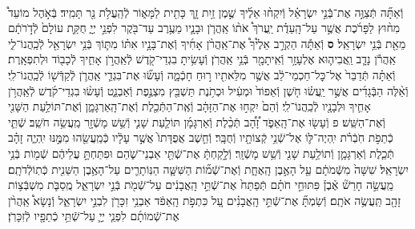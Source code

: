 \documentclass[twoside, openany, parskip=half, 11pt]{book}
\begin{document}
\begin{footnotesize}
\begin{multicols}{2}
\\
וְֿאַתָּ֞ה תְּֿצַוֶּ֣ה אֶת־בְּֿֿנֵ֣י יִשְׂרָאֵ֗ל וְֿיִקְח֨וּ אֵלֶ֜יךָ שֶׁ֣מֶן זַ֥יִת זָ֛ךְ כָּתִ֖ית לַמָּא֑וֹר לְֿהַֽעֲלֹ֥ת נֵ֖ר תָּמִֽיד׃ בְּֿאֹ֣הֶל מוֹעֵד֩ מִח֨וּץ לַפָּרֹ֜כֶת אֲשֶׁ֣ר עַל־הָֽעֵדֻ֗ת יַֽעֲרֹךְ֩ אֹת֨וֹ אַֽהֲרֹ֧ן וּבָנָ֛יו מֵעֶ֥רֶב עַד־בֹּ֖קֶר לִפְנֵ֣י יְיָ֑ חֻקַּ֤ת עוֹלָם֙ לְֿדֹ֣רֹתָ֔ם מֵאֵ֖ת בְּֿנֵ֥י יִשְׂרָאֵֽל׃ \textbf{ס} וְֿאַתָּ֡ה הַקְרֵ֣ב אֵלֶ֩יךָ֩ אֶת־אַֽהֲרֹ֨ן אָחִ֜יךָ וְֿאֶת־בָּנָ֣יו אִתּ֗וֹ מִתּ֛וֹךְ בְּֿנֵ֥י יִשְׂרָאֵ֖ל לְֿכַֽהֲנוֹ־לִ֑י אַֽהֲרֹ֕ן נָדָ֧ב וַֽאֲבִיה֛וּא אֶלְעָזָ֥ר וְֿאִֽיתָמָ֖ר בְּֿנֵ֥י אַֽהֲרֹֽן׃ וְֿעָשִׂ֥יתָ בִגְדֵי־קֹ֖דֶשׁ לְֿאַֽהֲרֹ֣ן אָחִ֑יךָ לְֿכָב֖וֹד וּלְתִפְאָֽרֶת׃
וְֿאַתָּ֗ה תְּֿדַבֵּר֙ אֶל־כׇּל־חַכְמֵי־לֵ֔ב אֲשֶׁ֥ר מִלֵּאתִ֖יו ר֣וּחַ חָכְֿמָ֑ה וְֿעָשׂ֞וּ אֶת־בִּגְדֵ֧י אַֽהֲרֹ֛ן לְֿקַדְּֿשׁ֖וֹ לְֿכַֽהֲנוֹ־לִֽי׃ וְֿאֵ֨לֶּה הַבְּֿגָדִ֜ים אֲשֶׁ֣ר יַֽעֲשׂ֗וּ חֹ֤שֶׁן וְֿאֵפוֹד֙ וּמְעִ֔יל וּכְתֹ֥נֶת תַּשְׁבֵּ֖ץ מִצְנֶ֣פֶת וְֿאַבְנֵ֑ט וְֿעָשׂ֨וּ בִגְדֵי־קֹ֜דֶשׁ לְֿאַֽהֲרֹ֥ן אָחִ֛יךָ וּלְבָנָ֖יו לְֿכַֽהֲנוֹ־לִֽי׃ וְֿהֵם֙ יִקְח֣וּ אֶת־הַזָּהָ֔ב וְֿאֶֽת־הַתְּֿכֵ֖לֶת וְֿאֶת־הָֽאַרְגָּמָ֑ן וְֿאֶת־תּוֹלַ֥עַת הַשָּׁנִ֖י וְֿאֶת־הַשֵּֽׁשׁ׃ פ
וְֿעָשׂ֖וּ אֶת־הָֽאֵפֹ֑ד זָ֠הָ֠ב תְּֿכֵ֨לֶת וְֿאַרְגָּמָ֜ן תּוֹלַ֧עַת שָׁנִ֛י וְֿשֵׁ֥שׁ מָשְֿׁזָ֖ר מַֽעֲשֵׂ֥ה חֹשֵֽׁב׃ שְֿׁתֵּ֧י כְֿתֵפֹ֣ת חֹֽבְֿרֹ֗ת יִֽהְיֶה־לּ֛וֹ אֶל־שְֿׁנֵ֥י קְֿצוֹתָ֖יו וְֿחֻבָּֽר׃ וְֿחֵ֤שֶׁב אֲפֻדָּתוֹ֙ אֲשֶׁ֣ר עָלָ֔יו כְּֿמַֽעֲשֵׂ֖הוּ מִמֶּ֣נּוּ יִֽהְיֶ֑ה זָהָ֗ב תְּֿכֵ֧לֶת וְֿאַרְגָּמָ֛ן וְֿתוֹלַ֥עַת שָׁנִ֖י וְֿשֵׁ֥שׁ מָשְֿׁזָֽר׃ וְֿלָ֣קַחְתָּ֔ אֶת־שְֿׁתֵּ֖י אַבְנֵי־שֹׁ֑הַם וּפִתַּחְתָּ֣ עֲלֵיהֶ֔ם שְֿׁמ֖וֹת בְּֿנֵ֥י יִשְׂרָאֵֽל׃
שִׁשָּׁה֙ מִשְּֿׁמֹתָ֔ם עַ֖ל הָאֶ֣בֶן הָֽאֶחָ֑ת וְֿאֶת־שְֿׁמ֞וֹת הַשִּׁשָּׁ֧ה הַנּֽוֹתָרִ֛ים עַל־הָאֶ֥בֶן הַשֵּׁנִ֖ית כְּֿתֽוֹלְֿדֹתָֽם׃ מַֽעֲשֵׂ֣ה חָרַשׁ֘ אֶ֒בֶן֒ פִּתּוּחֵ֣י חֹתָ֗ם תְּֿפַתַּח֙ אֶת־שְֿׁתֵּ֣י הָֽאֲבָנִ֔ים עַל־שְֿׁמֹ֖ת בְּֿנֵ֣י יִשְׂרָאֵ֑ל מֻֽסַבֹּ֛ת מִשְׁבְּֿצ֥וֹת זָהָ֖ב תַּֽעֲשֶׂ֥ה אֹתָֽם׃ וְֿשַׂמְתָּ֞ אֶת־שְֿׁתֵּ֣י הָֽאֲבָנִ֗ים עַ֚ל כִּתְפֹ֣ת הָֽאֵפֹ֔ד אַבְנֵ֥י זִכָּרֹ֖ן לִבְנֵ֣י יִשְׂרָאֵ֑ל וְֿנָשָׂא֩ אַֽהֲרֹ֨ן אֶת־שְֿׁמוֹתָ֜ם לִפְנֵ֧י יְיָ֛ עַל־שְֿׁתֵּ֥י כְֿתֵפָ֖יו לְֿזִכָּרֹֽן׃


\end{multicols}
\end{footnotesize}
\end{document}

